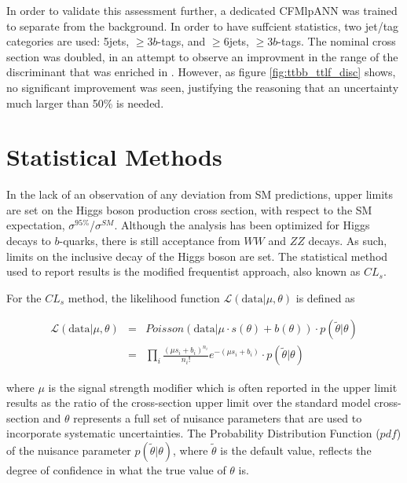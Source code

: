 \begin{description}
    In order to validate this assessment further, a dedicated CFMlpANN
    was trained to separate \ttbb from the \ttjets background.  In
    order to have suffcient statistics, two jet/tag categories are
    used: 5jets, $\ge$3$b$-tags, and $\ge$6jets, $\ge$3$b$-tags.  The
    nominal \ttbb cross section was doubled, in an attempt to observe
    an improvment in the range of the discriminant that was enriched
    in \ttbb.  However, as figure \ref{fig:ttbb_ttlf_disc} shows, no
    significant improvement was seen, justifying the reasoning that an
    uncertainty much larger  than 50\% is needed.  

\end{description}

\section{Statistical Methods}
\label{statistical_methods_overview}

\par In the lack of an observation of any deviation from SM
predictions, upper limits are set on the Higgs boson production cross
section, with respect to the SM expectation,
$\sigma^{95\%}$/$\sigma^{SM}$. Although the analysis has been
optimized for Higgs decays to $b$-quarks, there is still acceptance
from $WW$ and $ZZ$ decays.  As such, limits on the inclusive decay of
the Higgs boson are set.  The statistical method used to report
results is the modified frequentist approach, also known as
$CL_{s}$.

\par For the $CL_{s}$ method, the likelihood function
$\mathcal{L}(\mathrm{data}|\mu,\theta)$ is defined as  

\begin{eqnarray}\label{eq:Likelihood}
\mathcal{L}(\mathrm{data}|\mu,\theta)      & = & Poisson(\mathrm{data}|\mu \cdot s(\theta) + b(\theta)) \cdot p(\tilde{\theta}|\theta)  \\  
   								& = & \prod_{i} \frac{(\mu s_{i} + b_{i})^{n_{i}}}{n_{i}!} e^{-(\mu s_{i}+b_{i}) }  \cdot p(\tilde{\theta}|\theta) 
\end{eqnarray}

\noindent where $\mu$ is the signal strength modifier which is often
reported in the upper limit results as the ratio of the cross-section
upper limit over the standard model cross-section and $\theta$
represents a full set of nuisance parameters that are used to
incorporate systematic uncertainties. The Probability Distribution
Function ($pdf$) of the nuisance parameter $p(\tilde{\theta}|\theta)$,
where $\tilde{\theta}$ is the default value, reflects the degree of
confidence in what the true value of $\theta$ is. 

